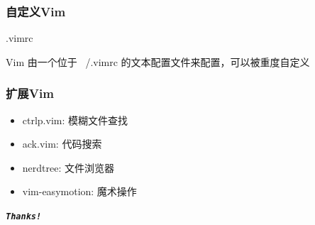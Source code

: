 \documentclass[UTF8, 16pt]{beamer}
\begin{document}
\begin{frame}
    \frametitle{自定义Vim}
    \textcolor{sufered}{.vimrc}

    Vim 由一个位于 ~/.vimrc 的文本配置文件来配置，可以被重度自定义
\end{frame}

\begin{frame}
    \frametitle{扩展Vim}
    \begin{itemize}
        \item ctrlp.vim: 模糊文件查找
        \item ack.vim: 代码搜索
        \item nerdtree: 文件浏览器
        \item vim-easymotion: 魔术操作
    \end{itemize}
\end{frame}






\begin{frame}[allowframebreaks]%
    \begin{center}
        \Huge\textbf{\textit{\texttt{Thanks!}}}
    \end{center}
\end{frame}
\end{document}
